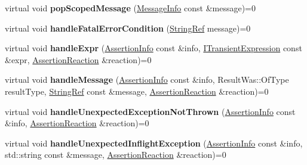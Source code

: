 \begin{DoxyCompactItemize}
\item 
virtual void {\bfseries pop\+Scoped\+Message} (\hyperlink{structCatch_1_1MessageInfo}{Message\+Info} const \&message)=0\hypertarget{structCatch_1_1IResultCapture_a42bcb13276706bf8c3ce081ce16d37fd}{}\label{structCatch_1_1IResultCapture_a42bcb13276706bf8c3ce081ce16d37fd}

\item 
virtual void {\bfseries handle\+Fatal\+Error\+Condition} (\hyperlink{classCatch_1_1StringRef}{String\+Ref} message)=0\hypertarget{structCatch_1_1IResultCapture_a48559e6598ba9474b903697b69c769b2}{}\label{structCatch_1_1IResultCapture_a48559e6598ba9474b903697b69c769b2}

\item 
virtual void {\bfseries handle\+Expr} (\hyperlink{structCatch_1_1AssertionInfo}{Assertion\+Info} const \&info, \hyperlink{structCatch_1_1ITransientExpression}{I\+Transient\+Expression} const \&expr, \hyperlink{structCatch_1_1AssertionReaction}{Assertion\+Reaction} \&reaction)=0\hypertarget{structCatch_1_1IResultCapture_a59a2b05391e464954575d2afb6d5d607}{}\label{structCatch_1_1IResultCapture_a59a2b05391e464954575d2afb6d5d607}

\item 
virtual void {\bfseries handle\+Message} (\hyperlink{structCatch_1_1AssertionInfo}{Assertion\+Info} const \&info, Result\+Was\+::\+Of\+Type result\+Type, \hyperlink{classCatch_1_1StringRef}{String\+Ref} const \&message, \hyperlink{structCatch_1_1AssertionReaction}{Assertion\+Reaction} \&reaction)=0\hypertarget{structCatch_1_1IResultCapture_a21788ebc64571abf322b80c8cc51794d}{}\label{structCatch_1_1IResultCapture_a21788ebc64571abf322b80c8cc51794d}

\item 
virtual void {\bfseries handle\+Unexpected\+Exception\+Not\+Thrown} (\hyperlink{structCatch_1_1AssertionInfo}{Assertion\+Info} const \&info, \hyperlink{structCatch_1_1AssertionReaction}{Assertion\+Reaction} \&reaction)=0\hypertarget{structCatch_1_1IResultCapture_a6382ed20486e2d9a020da971c6d5c53d}{}\label{structCatch_1_1IResultCapture_a6382ed20486e2d9a020da971c6d5c53d}

\item 
virtual void {\bfseries handle\+Unexpected\+Inflight\+Exception} (\hyperlink{structCatch_1_1AssertionInfo}{Assertion\+Info} const \&info, std\+::string const \&message, \hyperlink{structCatch_1_1AssertionReaction}{Assertion\+Reaction} \&reaction)=0\hypertarget{structCatch_1_1IResultCapture_afc97bc69829185222f955ebeef97adfe}{}\label{structCatch_1_1IResultCapture_afc97bc69829185222f955ebeef97adfe}


\end{DoxyCompactItemize}
